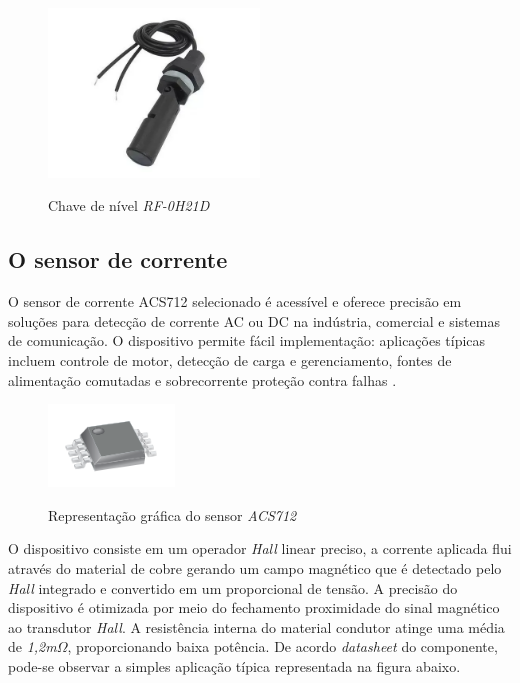 \begin{figure}[H]
	\centering
	\caption{Chave de nível \textit{RF-0H21D}}
	\includegraphics[width=0.5\textwidth]{figuras/chave_boia.png}
	\label{fig:chaveboia}
\end{figure}


\subsection{O sensor de corrente}

O sensor de corrente ACS712 selecionado é acessível e oferece precisão em soluções para detecção de corrente AC ou DC na indústria,
comercial e sistemas de comunicação. O dispositivo permite fácil implementação: aplicações típicas incluem controle de motor, detecção de carga e gerenciamento, fontes de alimentação comutadas e sobrecorrente proteção contra falhas \cite{ACS712}.


\begin{figure}[H]
	\centering
	\caption{Representação gráfica do sensor \textit{ACS712}}
	\includegraphics[width=0.3\textwidth]{figuras/ACS712.png}
	\label{fig:acs712}
\end{figure} 


O dispositivo consiste em um operador \textit{Hall} linear preciso, a corrente aplicada flui através do material de cobre gerando um campo magnético que é detectado pelo \textit{Hall} integrado e convertido em um proporcional de tensão. A precisão do dispositivo é otimizada por meio do fechamento proximidade do sinal magnético ao transdutor \textit{Hall}. A resistência interna do material condutor atinge uma média de \textit{1,2m}$\Omega$, proporcionando baixa potência. De acordo \textit{datasheet} do componente, pode-se observar a simples aplicação típica representada na figura abaixo.
 
